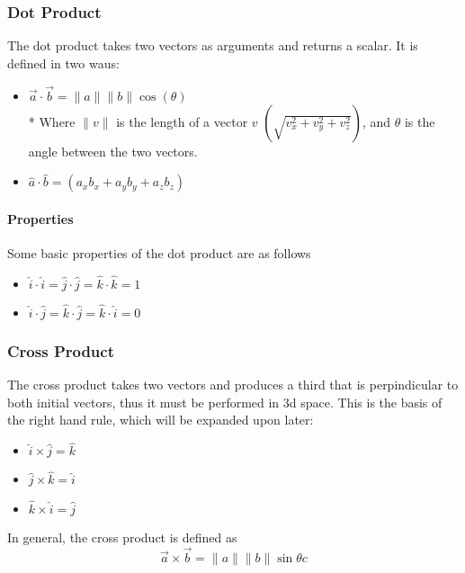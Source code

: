 \documentclass[a4paper,12pt]{article}
\begin{document}
						\subsubsection{Dot Product}
								The dot product takes two vectors as arguments and returns a scalar. It is defined in two waus:
								\begin{itemize}
										\item $\vec{a} \cdot \vec{b} = \|a\|\|b\|\cos(\theta)$\\*
										Where $\|v\|$ is the length of a vector $v$  $\left( \sqrt{v_{x}^{2} + v_{y}^{2} + v_{z}^{2}}\right)$, and $\theta$ is the angle between the two vectors.
										\item $\hat{a} \cdot \hat{b} = (a_{x}b_{x} + a_{y}b_{y} + a_{z}b_{z})$ 
								\end{itemize}
								\paragraph{Properties}
										Some basic properties of the dot product are as follows
										\begin{itemize}
												\item $\hat{i} \cdot \hat{i} = \hat{j} \cdot \hat{j} = \hat{k} \cdot \hat{k} = 1$
												\item $\hat{i} \cdot \hat{j}=\hat{k} \cdot \hat{j}=\hat{k} \cdot \hat{i} = 0$ 
										\end{itemize}
						\subsubsection{Cross Product}
								The cross product takes two vectors and produces a third that is perpindicular to both initial vectors, thus it must be performed in 3d space. This is the basis of the right hand rule, which will be expanded upon later:
								\begin{itemize}
										\item $\hat{i} \times \hat{j}=\hat{k}$
										\item $\hat{j} \times \hat{k}=\hat{i}$
										\item $\hat{k} \times \hat{i}=\hat{j}$
								\end{itemize}

								In general, the cross product is defined as
								\begin{equation*}
										\vec{a} \times \vec{b} = \|a\|\|b\|\sin{\theta}c
								\end{equation*}
\end{document}
